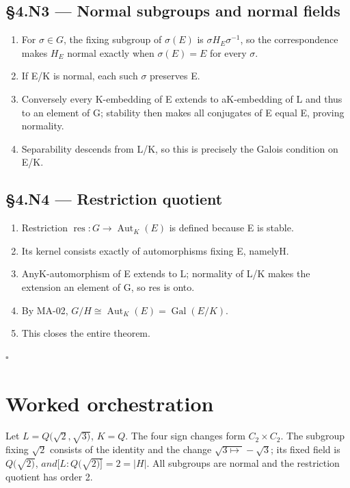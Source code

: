 \documentclass[preprint,12pt,aps,pra,showkeys,amsmath,amssymb,superscriptaddress,floatfix]{revtex4-2}
\theoremstyle{definition}
\theoremstyle{remark}
\begin{document}
\subsection{§4.N3 --- Normal subgroups and normal
fields}\label{n3-normal-subgroups-and-normal-fields}

\begin{enumerate}
\def\labelenumi{\arabic{enumi}.}
\item
  For \(\sigma \in G\), the fixing subgroup of \(\sigma (E)\) is
  \(\sigma H_E\sigma ^{-1}\), so the correspondence makes \(H_E\) normal
  exactly when \(\sigma (E)=E\) for every \(\sigma\).
\item
  If E/K is normal, each such \(\sigma\) preserves E.
\item
  Conversely every K-embedding of E extends to aK-embedding of L and
  thus to an element of G; stability then makes all conjugates of E
  equal E, proving normality.
\item
  Separability descends from L/K, so this is precisely the Galois
  condition on E/K.
\end{enumerate}

\subsection{§4.N4 --- Restriction
quotient}\label{n4-restriction-quotient}

\begin{enumerate}
\def\labelenumi{\arabic{enumi}.}
\item
  Restriction \(\operatorname{res} :G\to \operatorname{Aut} _K(E)\) is
  defined because E is stable.
\item
  Its kernel consists exactly of automorphisms fixing E, namelyH.
\item
  AnyK-automorphism of E extends to L; normality of L/K makes the
  extension an element of G, so res is onto.
\item
  By MA-02,
  \(G/H\cong \operatorname{Aut} _K(E)=\operatorname{Gal} (E/K)\).
\item
  This closes the entire theorem.
\end{enumerate}

\hfill$\square$

\section{Worked orchestration}

Let \(L=Q(\sqrt{2},\sqrt{3)}\), \(K=Q\). The four sign changes form
\(C_{2}\times C_{2}\). The subgroup fixing \(\sqrt{2}\) consists of the
identity and the change \(\sqrt{3\mapsto }-\sqrt{3}\); its fixed field
is \(Q(\sqrt{2)}\), \(and[L:Q(\sqrt{2)]}=2=|H|\). All subgroups are
normal and the restriction quotient has order 2.
\end{document}
